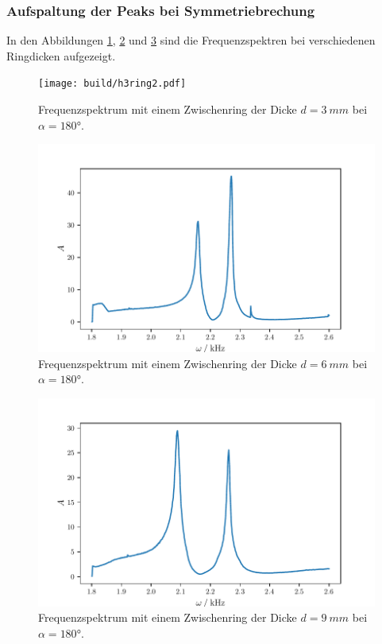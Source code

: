 \subsubsection{Aufspaltung der Peaks bei Symmetriebrechung}
In den Abbildungen \ref{fig:h3ring2}, \ref{fig:h6ring} und \ref{fig:h9ring} sind die Frequenzspektren bei verschiedenen Ringdicken aufgezeigt.
\begin{figure}
    \centering
    \texttt{[image: build/h3ring2.pdf]}
    \caption{Frequenzspektrum mit einem Zwischenring der Dicke $d=\qty{3}{mm}$ bei $\alpha = \ang{180}$.}
    \label{fig:h3ring2}
\end{figure}
\begin{figure}
    \centering
    \includegraphics{build/h6ring.pdf}
    \caption{Frequenzspektrum mit einem Zwischenring der Dicke $d=\qty{6}{mm}$ bei $\alpha = \ang{180}$.}
    \label{fig:h6ring}
\end{figure}
\begin{figure}
    \centering
    \includegraphics{build/h9ring.pdf}
    \caption{Frequenzspektrum mit einem Zwischenring der Dicke $d=\qty{9}{mm}$ bei $\alpha = \ang{180}$.}
    \label{fig:h9ring}
\end{figure}
